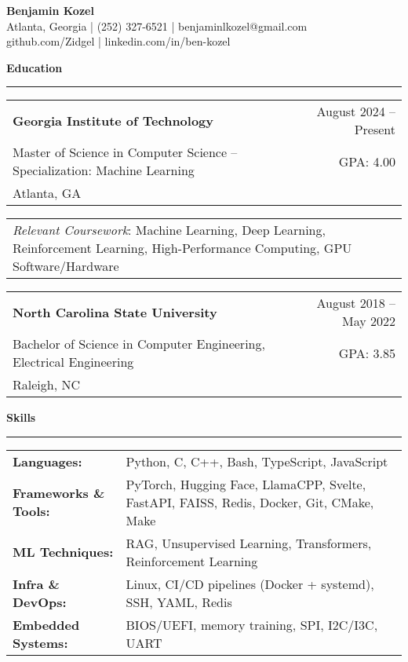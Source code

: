 \documentclass[a4paper,10pt]{article}
\begin{document}
{\centering
  {\Huge \textbf{Benjamin Kozel}} \\[4pt]
  \small Atlanta, Georgia \quad | \quad (252) 327-6521 \quad | \quad benjaminlkozel@gmail.com \\[2pt]
  \small github.com/Zidgel \quad | \quad linkedin.com/in/ben-kozel \par
}

\vspace{0.2in}

\textbf{Education}
\vspace{0.05in}
\hrule
\vspace{0.05in}

\begin{tabularx}{\textwidth}{X r}
\textbf{Georgia Institute of Technology} & August 2024 – Present \\
Master of Science in Computer Science – Specialization: Machine Learning & GPA: 4.00 \\
Atlanta, GA\\
\end{tabularx}

\begin{tabularx}{\textwidth}{X}
\textit{Relevant Coursework}: Machine Learning, Deep Learning, Reinforcement Learning, High-Performance Computing, GPU Software/Hardware
\end{tabularx}

\vspace{0.1in}

\begin{tabularx}{\textwidth}{X r}
\textbf{North Carolina State University} & August 2018 – May 2022 \\
Bachelor of Science in Computer Engineering, Electrical Engineering & GPA: 3.85 \\
Raleigh, NC\\
\end{tabularx}

\vspace{0.1in}
\textbf{Skills}
\vspace{0.05in}
\hrule
\vspace{0.05in}

\begin{tabularx}{\textwidth}{@{} l X @{}}
\textbf{Languages:} & Python, C, C++, Bash, TypeScript, JavaScript \\
\textbf{Frameworks \& Tools:} & PyTorch, Hugging Face, LlamaCPP, Svelte, FastAPI, FAISS, Redis, Docker, Git, CMake, Make \\
\textbf{ML Techniques:} & RAG, Unsupervised Learning, Transformers, Reinforcement Learning \\
\textbf{Infra \& DevOps:} & Linux, CI/CD pipelines (Docker + systemd), SSH, YAML, Redis \\
\textbf{Embedded Systems:} & BIOS/UEFI, memory training, SPI, I2C/I3C, UART \\
\end{tabularx}
\end{document}
